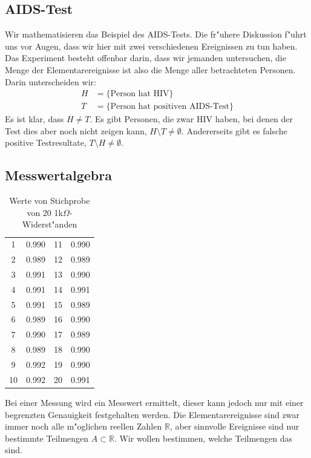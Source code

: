 \subsection{AIDS-Test}
Wir mathematisieren das Beispiel des AIDS-Tests.
Die fr"uhere Diskussion f"uhrt uns vor Augen,
dass wir hier mit zwei verschiedenen Ereignissen zu tun haben. 
Das Experiment besteht offenbar darin, dass wir jemanden untersuchen,
die Menge der Elementarereignisse ist also die Menge aller betrachteten
Personen.
Darin unterscheiden wir:
\begin{align*}
H&=\{\text{Person hat HIV}\}\\
T&=\{\text{Person hat positiven AIDS-Test}\}
\end{align*}
Es ist klar, dass $H\ne T$.
Es gibt Personen, die zwar HIV haben, bei
denen der Test dies aber noch nicht zeigen kann, $H\setminus T\ne \emptyset$.
Andererseits gibt es falsche positive Testresultate,
$T\setminus H\ne\emptyset$. 

\subsection{Messwertalgebra}
\begin{table}
\begin{center}
\begin{tabular}{|cc|cc|}
\hline
1&0.990
&11&0.990\\
2&0.989
&12&0.989\\
3&0.991
&13&0.990\\
4&0.991
&14&0.991\\
5&0.991
&15&0.989\\
6&0.989
&16&0.990\\
7&0.990
&17&0.989\\
8&0.989
&18&0.990\\
9&0.992
&19&0.990\\
10&0.992
&20&0.991\\
\hline
\end{tabular}
\end{center}
\caption{Werte von Stichprobe von 20 1k$\Omega$-Widerst"anden\label{widerstandswerte}}
\end{table}
Bei einer Messung wird ein Messwert ermittelt, dieser kann jedoch
nur mit einer begrenzten Genauigkeit festgehalten werden.
Die Elementarereignisse sind zwar immer noch alle m"oglichen reellen
Zahlen $\mathbb R$, aber sinnvolle Ereignisse sind nur bestimmte Teilmengen
$A\subset\mathbb R$.
Wir wollen bestimmen, welche Teilmengen das sind.

